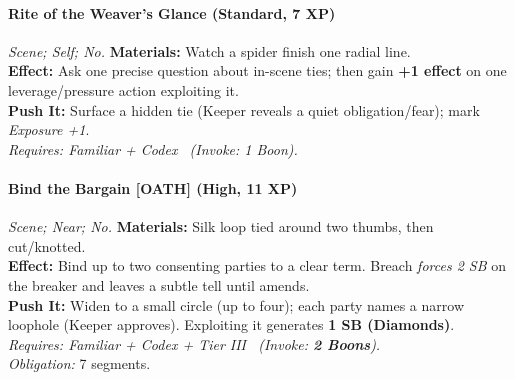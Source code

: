 \paragraph{Rite of the Weaver's Glance (Standard, 7 XP)} \emph{Scene; Self; No.}
\textbf{Materials:} Watch a spider finish one radial line.\\
\textbf{Effect:} Ask one precise question about in-scene ties; then gain \textbf{+1 effect} on one leverage/pressure action exploiting it.\\
\textbf{Push It:} Surface a hidden tie (Keeper reveals a quiet obligation/fear); mark \emph{Exposure +1}.\\
\emph{Requires: Familiar + Codex \ (\textit{Invoke:} 1 Boon).}

\paragraph{Bind the Bargain \textnormal{[OATH]} (High, 11 XP)} \emph{Scene; Near; No.}
\textbf{Materials:} Silk loop tied around two thumbs, then cut/knotted.\\
\textbf{Effect:} Bind up to two consenting parties to a clear term. Breach \emph{forces 2 SB} on the breaker and leaves a subtle tell until amends.\\
\textbf{Push It:} Widen to a small circle (up to four); each party names a narrow loophole (Keeper approves). Exploiting it generates \textbf{1 SB (Diamonds)}.\\
\emph{Requires: Familiar + Codex + Tier III \ (\textit{Invoke:} \textbf{2 Boons}).}\\
\emph{Obligation:} 7 segments.
